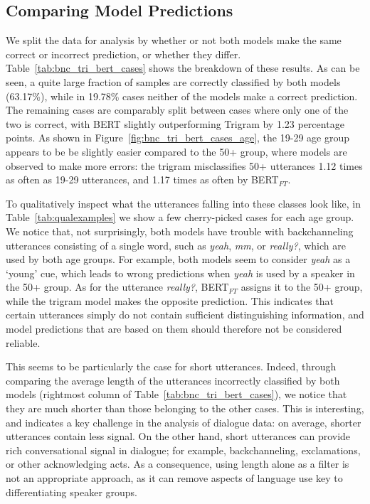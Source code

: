 \subsection{Comparing Model Predictions}
We split the data for analysis by whether or not both models make the same correct or incorrect prediction, or whether they differ. Table~\ref{tab:bnc_tri_bert_cases} shows the breakdown of these results.
As can be seen, a quite large fraction of samples are correctly classified by both models (63.17\%), while in 19.78\% cases neither of the models make a correct prediction. The remaining cases are comparably split between cases where only one of the two is correct, with BERT slightly outperforming Trigram by 1.23 percentage points. %
As shown in Figure~\ref{fig:bnc_tri_bert_cases_age}, the 19-29 age group appears to be be slightly easier compared to the 50+ group, where models are observed to make more errors: the trigram misclassifies 50+ utterances 1.12 times as often as 19-29 utterances, and 1.17 times as often by BERT$_{FT}$.

To qualitatively inspect what the utterances falling into these classes look like, in Table~\ref{tab:qualexamples} we show a few cherry-picked cases for each age group. 
We notice that, not surprisingly, both models have trouble with backchanneling utterances consisting of a single word, such as \emph{yeah}, \emph{mm}, or \emph{really?}, which are used by both age groups.
For example, both models seem to consider \emph{yeah} as a `young' cue, which leads to wrong predictions when \emph{yeah} is used by a speaker in the 50+ group. As for the utterance \emph{really?}, BERT$_{FT}$ assigns it to the 50+ group, while the trigram model makes the opposite prediction.
This indicates that certain utterances simply do not contain sufficient distinguishing information, and model predictions that are based on them should therefore not be considered reliable.

This seems to be particularly the case for short utterances. Indeed, through comparing the average length of the utterances incorrectly classified by both models (rightmost column of Table~\ref{tab:bnc_tri_bert_cases}), we notice that they are much shorter than those belonging to the other cases. This is interesting, and indicates a key challenge in the analysis of dialogue data: 
on average, shorter utterances contain less signal. On the other hand, short utterances can provide rich conversational signal in dialogue; for example, backchanneling, exclamations, or other acknowledging acts. As a consequence, using length alone as a filter is not an appropriate approach, as it can remove aspects of language use key to differentiating speaker groups.


